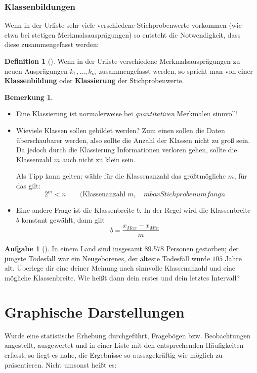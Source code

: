 \documentclass[a4paper, twoside, parskip, 10pt, smallheadings]{scrbook}
\theoremstyle{plain}
\theoremstyle{definition}
\newtheorem{Def}{Definition}%
\newtheorem{Auf}{Aufgabe}%
\newtheorem*{Bem}{Bemerkung}
\newenvironment{fshaded}{%
\def\FrameCommand{\fcolorbox{framecolor}{shadecolor}}%
\MakeFramed {\FrameRestore}}%
{\endMakeFramed}
\newenvironment{fdef}[1][]{\definecolor{shadecolor}{rgb}{1,1,.29}%
\definecolor{framecolor}{rgb}{1,1,0}%
\begin{fshaded}\begin{Def}[#1]}{\end{Def}\end{fshaded}}
\newenvironment{fauf}[1][]{\definecolor{shadecolor}{rgb}{.58,.788,1}%
\definecolor{framecolor}{rgb}{.13,.25,.9}%
\begin{fshaded}\begin{Auf}[#1]}{\end{Auf}\end{fshaded}}
\newcommand{\ba}{\begin{fauf}}
\newcommand{\ea}{\end{fauf}}
\newcommand{\bd}{\begin{fdef}}
\newcommand{\ed}{\end{fdef}}
\begin{document}
\subsubsection{Klassenbildungen}
Wenn in der Urliste sehr viele verschiedene Stichprobenwerte vorkommen (wie etwa bei stetigen
Merkmalsauspr\"{a}gungen) so entsteht die Notwendigkeit, dass diese zusammengefasst werden: 
\bd 
Wenn in der Urliste verschiedene Merkmalsauspr\"{a}gungen zu neuen Auspr\"{a}gungen $k_1, \dots,
k_m$ zusammengefasst werden, so spricht man von einer {\bf Klassenbildung} oder {\bf Klassierung}
der Stichprobenwerte.\ed  
\begin{Bem}
\begin{itemize}
\item Eine Klassierung ist normalerweise bei {\it quantitativen} Merkmalen sinnvoll!
\item Wieviele Klassen sollen gebildet werden? Zum einen sollen die Daten \"{u}berschaubarer werden, also sollte die Anzahl
der Klassen nicht zu gro{\ss} sein. Da jedoch durch die Klassierung Informationen verloren gehen,
sollte die Klassenzahl $m$ auch nicht zu klein sein.


Als Tipp kann gelten: wähle für die Klassenanzahl das größtmögliche $m$, für das gilt: $$2^m<n \qquad (\mbox{Klassenanzahl } m, \quad  mbox{Stichprobenumfang } n$$
 

\item Eine andere Frage ist die Klassenbreite $b$. In der Regel wird die Klassenbreite $b$ konstant gewählt, dann gilt $$b=\frac{x_{Max}-x_{Min}}{m}$$
\end{itemize}
\end{Bem}

\ba In einem Land sind insgesamt 89.578 Personen gestorben; der jüngste Todesfall war ein Neugeborenes, der älteste Todesfall wurde $105$ Jahre alt. Überlege dir eine deiner Meinung nach sinnvolle Klassenanzahl und eine mögliche Klassenbreite. Wie heißt dann dein erstes und dein letztes Intervall?
\ea 

\section{Graphische Darstellungen} \label{grphkeit}

Wurde eine statistische Erhebung durchgef\"{u}hrt, Frageb\"{o}gen bzw. Beobachtungen
angestellt, ausgewertet und in einer Liste mit den entsprechenden H\"{a}ufigkeiten erfasst, so
liegt es nahe, die Ergebnisse so aussagekr\"{a}ftig wie m\"{o}glich zu pr\"{a}sentieren.
Nicht umsonst heißt es:
\end{document}
